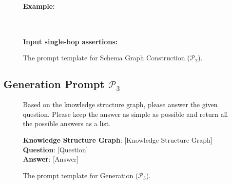 \documentclass[11pt]{article}
\begin{document}
\begin{figure}[H]
\begin{tcolorbox}
    \vspace{0.3cm}
    
    \textbf{Example:} \\
    \text{[EXAMPLE\_1]} \\
    \text{[EXAMPLE\_2]} \\
    
    \vspace{0.3cm}
    
    \textbf{Input single-hop assertions:} \\
    
    \end{tcolorbox}
    \caption{The prompt template for Schema Graph Construction ($\mathcal{P}_2$).}
    \label{fig:p2}
\end{figure}

\subsection{Generation Prompt \hyperref[fig:p3]{$ \mathcal{P}_3 $}}

\begin{figure}[H]
    \centering
    \footnotesize
    \begin{tcolorbox}[
        title={Generation Prompt ($\mathcal{P}_3$)},      %
        colback=gray!5,                        %
        colframe=gray!60,                  %
        coltitle=white,                       %
        fonttitle=\small\bfseries,            %
        boxrule=0.8pt,                        %
        left=2mm, right=2mm, top=2mm, bottom=2mm, %
        arc=1mm,                              %
        width=\columnwidth                      %
    ]
    
    Based on the knowledge structure graph, please answer the
    given question. Please keep the answer as simple as possible
    and return all the possible answers as a list.

    \vspace{0.3cm}

    \textbf{Knowledge Structure Graph}: [Knowledge Structure Graph]\\
    \textbf{Question}: [Question]\\
    \textbf{Answer}: [Answer]\\
    \end{tcolorbox}
    \caption{The prompt template for Generation ($\mathcal{P}_3$).}
    \label{fig:p3}
\end{figure}
\end{document}
